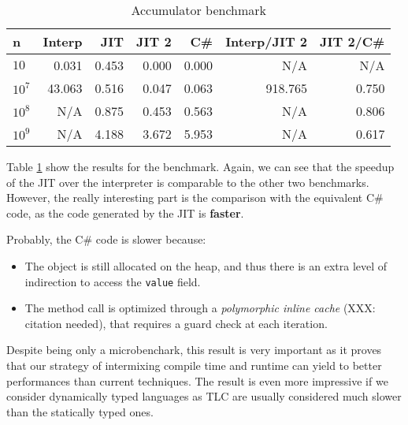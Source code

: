 \begin{table}[ht]
  \begin{tabular}{|l|r|r|r|r||r|r|}
    \hline
    \textbf{n} & 
    \textbf{Interp} &
    \textbf{JIT} &
    \textbf{JIT 2} &
    \textbf{C\#} &
    \textbf{Interp/JIT 2} &
    \textbf{JIT 2/C\#} \\
    \hline

    $10$    &   0.031  &  0.453  &  0.000  &  0.000  &      N/A  &  N/A   \\
    $10^7$  &  43.063  &  0.516  &  0.047  &  0.063  &  918.765  &  0.750 \\
    $10^8$  &     N/A  &  0.875  &  0.453  &  0.563  &      N/A  &  0.806 \\
    $10^9$  &     N/A  &  4.188  &  3.672  &  5.953  &      N/A  &  0.617 \\

    \hline

  \end{tabular}
  \caption{Accumulator benchmark}
  \label{tab:accumulator}
\end{table}


Table \ref{tab:accumulator} show the results for the benchmark.  Again, we can
see that the speedup of the JIT over the interpreter is comparable to the
other two benchmarks.  However, the really interesting part is the comparison
with the equivalent C\# code, as the code generated by the JIT is
\textbf{faster}.

Probably, the C\# code is slower because:

\begin{itemize}
\item The object is still allocated on the heap, and thus there is an extra
  level of indirection to access the \lstinline{value} field.
\item The method call is optimized through a \emph{polymorphic inline cache}
  (XXX: citation needed), that requires a guard check at each iteration.
\end{itemize}


Despite being only a microbenchark, this result is very important as it proves
that our strategy of intermixing compile time and runtime can yield to better
performances than current techniques.  The result is even more impressive if
we consider dynamically typed languages as TLC are usually considered much
slower than the statically typed ones.
